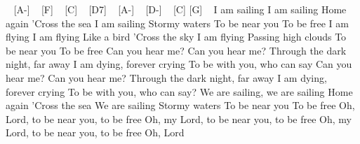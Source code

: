 

\begin{guitar}
[C] ~ [A-] ~ [F] ~ [C] ~ [D7] ~ [A-] ~ [D-] ~ [C] [G] ~
I am sailing
I am sailing
Home again
'Cross the sea
I am sailing
Stormy waters
To be near you
To be free
I am flying
I am flying
Like a bird
'Cross the sky
I am flying
Passing high clouds
To be near you
To be free
Can you hear me? Can you hear me?
Through the dark night, far away
I am dying, forever crying
To be with you, who can say
Can you hear me? Can you hear me?
Through the dark night, far away
I am dying, forever crying
To be with you, who can say?
We are sailing, we are sailing
Home again
'Cross the sea
We are sailing
Stormy waters
To be near you
To be free
Oh, Lord, to be near you, to be free
Oh, my Lord, to be near you, to be free
Oh, my Lord, to be near you, to be free
Oh, Lord
\end{guitar}